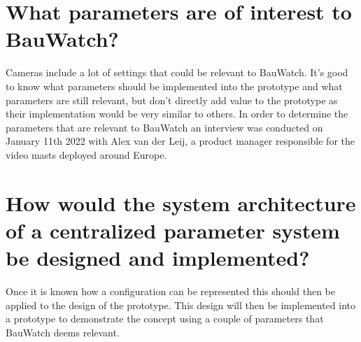 

% 



\section{What parameters are of interest to BauWatch?}
Cameras include a lot of settings that could be relevant to BauWatch.
It's good to know what parameters should be implemented into the prototype and what parameters are still relevant, but don't directly add value to the prototype as their implementation would be very similar to others.
In order to determine the parameters that are relevant to BauWatch an interview was conducted on January 11th 2022 with Alex van der Leij, a product manager responsible for the video masts deployed around Europe.

\section{How would the system architecture of a centralized parameter system be designed and implemented?}
Once it is known how a configuration can be represented this should then be applied to the design of the prototype. This design will then be implemented into a
prototype to demonstrate the concept using a couple of parameters that BauWatch deems relevant.


